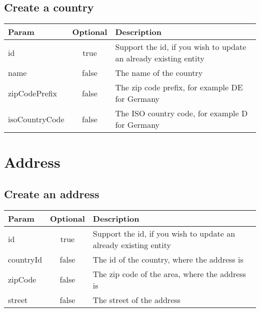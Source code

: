 \documentclass[a4paper,10pt]{book}
\newcommand{\thead}[1]{\textbf{\large{#1}}}
\begin{document}
\subsection{Create a country}
\label{s:ccountry}

\begin{tabular}{l | c | l}
\thead{Param} & \thead{Optional} & \thead{Description}\\
\hline
id & true & Support the id, if you wish to update an already existing entity\\
name & false & The name of the country \\
zipCodePrefix & false & The zip code prefix, for example DE for Germany \\
isoCountryCode & false & The ISO country code, for example D for Germany
 
\end{tabular} 

\section{Address}
\label{sec:address}

\subsection{Create an address}
\label{s:caddress}

\begin{tabular}{l | c | l}
\thead{Param} & \thead{Optional} & \thead{Description}\\
\hline
id & true & Support the id, if you wish to update an already existing entity\\
countryId & false & The id of the country, where the address is\\
zipCode & false & The zip code of the area, where the address is \\
street & false & The street of the address \\
 
\end{tabular} 
\end{document}
